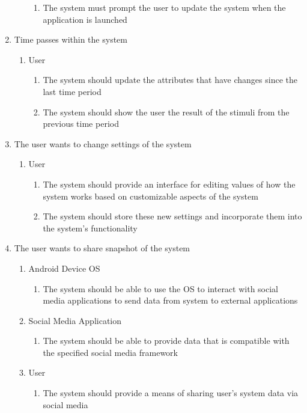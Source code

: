 \documentclass[]{article}
\begin{document}
\begin{enumerate}
\begin{enumerate}
\begin{enumerate}
				\item The system must prompt the user to update the system when the application is launched
			\end{enumerate}
	\end{enumerate}
	\item Time passes within the system
	\begin{enumerate}
		\item User
			\begin{enumerate}
				\item The system should update the attributes that have changes since the last time period
				\item The system should show the user the result of the stimuli from the previous time period
			\end{enumerate}
	\end{enumerate}
	\item The user wants to change settings of the system
	\begin{enumerate}
		\item User
			\begin{enumerate}
				\item The system should provide an interface for editing values of how the system works based on customizable aspects of the system
				\item The system should store these new settings and incorporate them into the system's functionality
			\end{enumerate}
	\end{enumerate}
	\item The user wants to share snapshot of the system
	\begin{enumerate}
		\item Android Device OS
			\begin{enumerate}
				\item The system should be able to use the OS to interact with social media applications to send data from system to external applications
			\end{enumerate}
		\item Social Media Application
			\begin{enumerate}
				\item The system should be able to provide data that is compatible with the specified social media framework
			\end{enumerate}
			\item User
			\begin{enumerate}
				\item The system should provide a means of sharing user's system data via social media

\end{enumerate}
\end{enumerate}
\end{enumerate}
\end{document}
